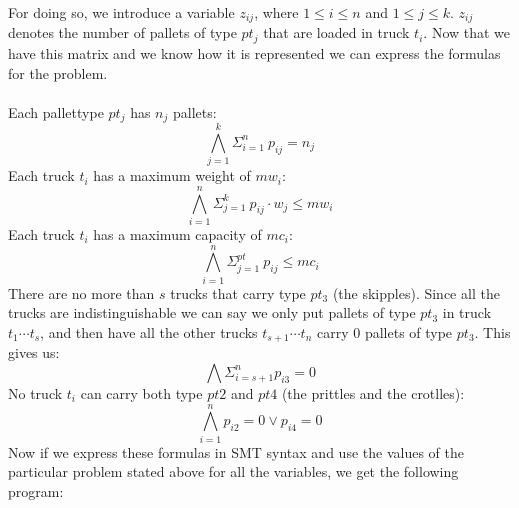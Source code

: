 \documentclass[12pt]{article}
\begin{document}
For doing so, we introduce a variable $z_{ij}$, where $1 \leq i \leq n$ and $1 \leq j \leq k$. $z_{ij}$ denotes the number of pallets of type $pt_j$ that are loaded in truck $t_i$. Now that we have this matrix and we know how it is represented we can express the formulas for the problem.
\\
\\
Each pallettype $pt_j$ has $n_j$ pallets:
\[\bigwedge_{j=1}^{k} \Sigma_{i=1}^{n} \ p_{ij} = n_j\]
Each truck $t_i$ has a maximum weight of $mw_i$:
\[\bigwedge_{i=1}^{n} \Sigma_{j=1}^{k} \ p_{ij} \cdot w_j \leq mw_i\]
Each truck $t_i$ has a maximum capacity of $mc_i$:
\[\bigwedge_{i=1}^{n} \Sigma_{j=1}^{pt} \ p_{ij}\leq mc_i\]
There are no more than $s$ trucks that carry type $pt_3$ (the skipples). Since all the trucks are indistinguishable we can say we only put pallets of type $pt_3$ in truck $t_1 \cdots t_s$, and then have all the other trucks $t_{s+1} \cdots t_n$ carry 0 pallets of type $pt_3$. This gives us:
\[\bigwedge \Sigma_{i=s + 1}^{n} p_{i3} = 0\]
No truck $t_i$ can carry both type $pt2$ and $pt4$ (the prittles and the crotlles):
\[\bigwedge_{i=1}^{n} p_{i2} = 0 \vee p_{i4} = 0 \]
Now if we express these formulas in SMT syntax and use the values of the particular problem stated above for all the variables, we get the following program:
\end{document}
